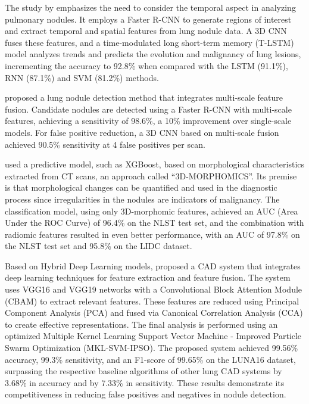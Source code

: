The study by \citet{liu_study_2022} emphasizes the need to consider the temporal aspect in analyzing pulmonary nodules. It employs a Faster R-CNN to generate regions of interest and extract temporal and spatial features from lung nodule data. A 3D CNN fuses these features, and a time-modulated long short-term memory (T-LSTM) model analyzes trends and predicts the evolution and malignancy of lung lesions, incrementing the accuracy to 92.8\% when compared with the LSTM (91.1\%), RNN (87.1\%) and SVM (81.2\%) methods.

\citet{zhao_pulmonary_2022} proposed a lung nodule detection method that integrates multi-scale feature fusion. Candidate nodules are detected using a Faster R-CNN with multi-scale features, achieving a sensitivity of 98.6\%, a 10\% improvement over single-scale models. For false positive reduction, a 3D CNN based on multi-scale fusion achieved 90.5\% sensitivity at 4 false positives per scan.

\citet{munoz_3d-morphomics_2022} used a predictive model, such as XGBoost, based on morphological characteristics extracted from CT scans, an approach called “3D-MORPHOMICS”. Its premise is that morphological changes can be quantified and used in the diagnostic process since irregularities in the nodules are indicators of malignancy. The classification model, using only 3D-morphomic features, achieved an AUC (Area Under the ROC Curve) of 96.4\% on the NLST test set, and the combination with radiomic features resulted in even better performance, with an AUC of 97.8\% on the NLST test set and 95.8\% on the LIDC dataset.

Based on Hybrid Deep Learning models, \citet{li_research_2022} proposed a CAD system that integrates deep learning techniques for feature extraction and feature fusion. The system uses VGG16 and VGG19 networks with a Convolutional Block Attention Module (CBAM) to extract relevant features. These features are reduced using Principal Component Analysis (PCA) and fused via Canonical Correlation Analysis (CCA) to create effective representations. The final analysis is performed using an optimized Multiple Kernel Learning Support Vector Machine - Improved Particle Swarm Optimization (MKL-SVM-IPSO). The proposed system achieved 99.56\% accuracy, 99.3\% sensitivity, and an F1-score of 99.65\% on the LUNA16 dataset, surpassing the respective baseline algorithms of other lung CAD systems by 3.68\% in accuracy and by 7.33\% in sensitivity. These results demonstrate its competitiveness in reducing false positives and negatives in nodule detection.

